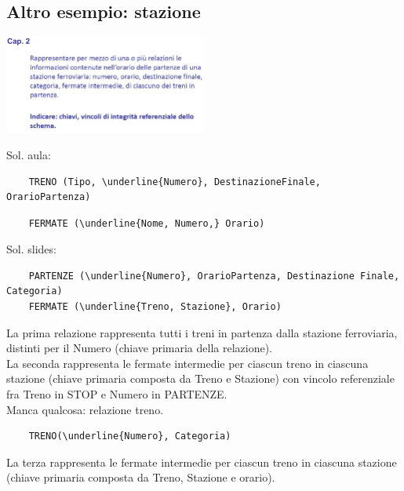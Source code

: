 \subsection{Altro esempio: stazione}
\begin{center}
    \includegraphics[width=0.5\textwidth]{img/MR_es_stazione1.jpg}
\end{center}
Sol. aula:
\begin{verbatim}
    TRENO (Tipo, \underline{Numero}, DestinazioneFinale, OrarioPartenza)
\end{verbatim}
                            \uparrow
\begin{verbatim}
    FERMATE (\underline{Nome, Numero,} Orario)
\end{verbatim}
Sol. slides:
\begin{verbatim}
    PARTENZE (\underline{Numero}, OrarioPartenza, Destinazione Finale, Categoria)
    FERMATE (\underline{Treno, Stazione}, Orario)
\end{verbatim}
La prima relazione rappresenta tutti i treni in partenza dalla stazione ferroviaria, distinti per il Numero (chiave primaria della relazione).
\\La seconda rappresenta le fermate intermedie per ciascun treno in ciascuna stazione (chiave primaria composta da Treno e Stazione) con vincolo referenziale fra Treno in STOP e Numero in PARTENZE.
\\Manca qualcosa: relazione treno.
\begin{verbatim}
    TRENO(\underline{Numero}, Categoria)
\end{verbatim}
La terza rappresenta le fermate intermedie per ciascun treno in ciascuna stazione (chiave primaria composta da Treno, Stazione e orario).

